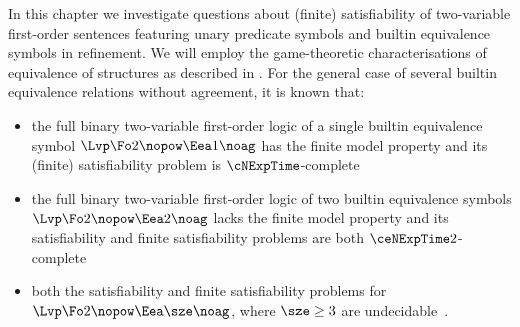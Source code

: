 In this chapter we investigate questions about (finite) satisfiability of
two-variable first-order sentences featuring unary predicate symbols and builtin
equivalence symbols in refinement.
We will employ the game-theoretic characterisations of equivalence of
structures as described in .
For the general case of several builtin equivalence relations without agreement,
it is known that:
\begin{itemize}
  \item the full binary two-variable first-order logic of a single
  builtin equivalence symbol $\Lvp\Fo2\nopow\Eea1\noag$ has the finite model
  property and its (finite) satisfiability problem is 
  $\cNExpTime$-complete~\cite{kieronski2005small} 
  \item the full binary two-variable first-order logic of two
  builtin equivalence symbols $\Lvp\Fo2\nopow\Eea2\noag$ lacks the finite model
  property and its satisfiability and finite satisfiability problems are both
  $\ceNExpTime2$-complete~\cite{kieronski2014two}
  \item both the satisfiability and finite satisfiability problems for
  $\Lvp\Fo2\nopow\Eea\sze\noag$, where $\sze \geq 3$ are
  undecidable~\cite{kieronski2005small}.
\end{itemize}